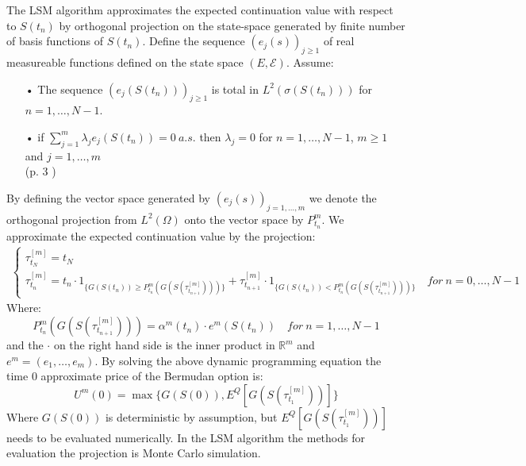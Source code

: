The LSM algorithm approximates the expected continuation value with respect to $S(t_{n})$ by orthogonal projection on the state-space generated by finite number of basis functions of $S(t_{n})$. Define the sequence $(e_{j}(s))_{j\geq 1}$ of real measureable functions defined on the state space $(E,\mathcal{E})$. Assume:
\begin{enumerate}\label{AssumptionBasisFck}
\item[•] The sequence $(e_{j}(S(t_n)))_{j\geq 1}$ is total in $L^2(\sigma(S(t_n)))$ for $n=1,\ldots,N-1$.
\item[•] if $\sum_{j=1}^{m} \lambda_j e_{j}(S(t_n))=0 \ a.s.$ then $\lambda_j=0$ for $n=1,\ldots,N-1$, $m\geq 1$ and $j=1,\ldots,m$\\
\null \hfill (p. 3 \parencite{analysisLSM})
\end{enumerate}
By defining the vector space generated by $(e_{j}(s))_{j=1, \ldots, m}$ we denote the orthogonal projection from $L^2(\Omega)$ onto the vector space by $P^m_{t_n}$.
We approximate the expected continuation value by the projection:
\begin{equation*}\label{LSMDynamic2}
\begin{split}
\begin{cases}
          \tau_{t_N}^{[m]} = t_N\\
          \tau_{t_n}^{[m]} = t_n \cdot 1_{\{G(S(t_n)) \geq P^m_{t_n}(G(S(\tau^{[m]}_{t_{n+1}})))\}} + \tau^{[m]}_{t_{n+1}} \cdot 1_{\{G(S(t_n)) < P^m_{t_n}(G(S(\tau^{[m]}_{t_{n+1}}))) \}} \quad for \ n={0,\ldots,N-1} 
\end{cases}
\end{split}
\end{equation*}
Where:
$$P^m_{t_n}(G(S(\tau^{[m]}_{t_{n+1}})))=\alpha^{m}(t_{n}) \cdot e^m(S(t_{n})) \quad for \ n=1,\ldots,N-1$$
and the $\cdot$ on the right hand side is the inner product in $\mathbb{R}^m$ and $e^m=(e_1,\ldots, e_m)$.
By solving the above dynamic programming equation the time 0 approximate price of the Bermudan option is:
$$U^m(0)=\max \{ G(S(0)), E^Q[G(S(\tau^{[m]}_{t_1}))]\}$$
Where $G(S(0))$ is deterministic by assumption, but $E^Q[G(S(\tau^{[m]}_{t_1}))]$ needs to be evaluated numerically. In the LSM algorithm the methods for evaluation the projection is Monte Carlo simulation.\\


